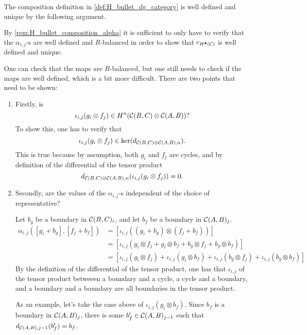\begin{remark}
    The composition definition in \autoref{def:H_bullet_dg_category} is well defined and unique by the following argument.

    By \autoref{rem:H_bullet_composition_alpha} it is sufficient to only have to verify that the \( \alpha_{i, j} \)-s are well defined and \( R \)-balanced in order to show that \( c_{H^\bullet({\mathcal{C}})} \) is well defined and unique.

    One can check that the maps are \( R \)-balanced, but one still needs to check if the maps are well defined, which is a bit more difficult. There are two points that need to be shown:
    \begin{enumerate}
        \item {
            Firstly, is
            \[
                \iota_{i, j}(g_i \otimes f_j) \in H^n({\mathcal{C}}(B, C) \otimes {\mathcal{C}}(A, B))?
            \]
            To show this, one has to verify that
            \[
                \iota_{i, j}(g_i \otimes f_j) \in \ker(d_{{\mathcal{C}}(B, C) \otimes {\mathcal{C}}(A, B), n}).
            \]
            This is true because by assumption, both \( g_i \) and \( f_j \) are cycles, and by definition of the differential of the tensor product
            \[
                d_{{\mathcal{C}}(B, C) \otimes {\mathcal{C}}(A, B), n}(\iota_{i, j}(g_i \otimes f_j)) = 0.
            \]
        }
        \item {
            Secondly, are the values of the \( \alpha_{i, j} \)-s independent of the choice of representative?

            Let \( b_g \) be a boundary in \( {\mathcal{C}}(B, C)_i \), and let \( b_f \) be a boundary in \( {\mathcal{C}}(A, B)_j \).
            \begin{align*}
                \alpha_{i, j}([g_i + b_g], [f_j + b_f]) &= [\iota_{i, j}((g_i + b_g) \otimes (f_j + b_f))] \\
                &= [\iota_{i, j}(g_i \otimes f_j + g_i \otimes b_f + b_g \otimes f_j + b_g \otimes b_f)] \\
                &= [\iota_{i, j}(g_i \otimes f_j) + \iota_{i, j}(g_i \otimes b_f) + \iota_{i, j}(b_g \otimes f_j) + \iota_ {i, j}(b_g \otimes b_f)]
            \end{align*}
            By the definition of the differential of the tensor product, one has that \( \iota_{i, j} \) of the tensor product betweeen a boundary and a cycle, a cycle and a boundary, and a boundary and a boundary are all boundaries in the tensor product.

            As an example, let's take the case above of \( \iota_{i, j}(g_i \otimes b_f) \). Since \( b_f \) is a boundary in \( {\mathcal{C}}(A, B)_j \), there is some \( b_f' \in {\mathcal{C}}(A, B)_{j - 1} \) such that \( d_{{\mathcal{C}}(A, B), j - 1}(b_f') = b_f \).

}
\end{enumerate}
\end{remark}
